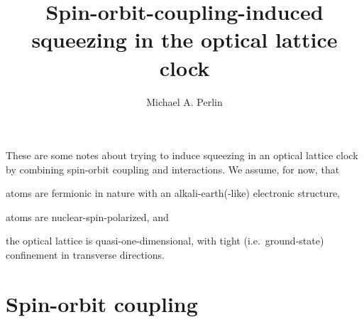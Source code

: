 \documentclass[aps,notitlepage,nofootinbib,11pt]{revtex4-1}
\newcommand{\1}{\hat{\mathds{1}}}
\begin{document}
\title{Spin-orbit-coupling-induced squeezing in the optical lattice
  clock}

\author{Michael A. Perlin}

\maketitle

These are some notes about trying to induce squeezing in an optical
lattice clock by combining spin-orbit coupling and interactions.  We
assume, for now, that
\begin{enumerate*}[label=(\roman*)]
\item atoms are fermionic in nature with an alkali-earth(-like)
  electronic structure,
\item atoms are nuclear-spin-polarized, and
\item the optical lattice is quasi-one-dimensional, with tight
  (i.e.~ground-state) confinement in transverse directions.
\end{enumerate*}


\section{Spin-orbit coupling}
\end{document}
